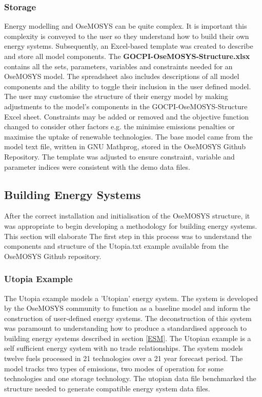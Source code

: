 \documentclass[12pt]{article}
\begin{document}
\subsubsection{Storage}\label{OSTORAGE}
Energy modelling and OseMOSYS can be quite complex. It is important this complexity is conveyed to the user so they understand how to build their own energy systems.
Subsequently, an Excel-based template was created to describe and store all model components. The \textbf{GOCPI-OseMOSYS-Structure.xlsx} contains
all the sets, parameters, variables and constraints needed for an OseMOSYS model. The spreadsheet also includes descriptions of all model components
and the ability to toggle their inclusion in the user defined model. 
The user may customise the structure of their energy model by making adjustments to the model's components in the GOCPI-OseMOSYS-Structure Excel sheet.
Constraints may be added or removed and the objective function changed to consider other factors e.g. the minimise emissions penalties or maximise the uptake of renewable technologies.
The base model came from the model text file, written in GNU Mathprog, stored in the OseMOSYS Github Repository.
The template was adjusted to ensure constraint, variable and parameter indices were consistent with the demo data files.

\subsection{Building Energy Systems}\label{BES}
After the correct installation and initialisation of the OseMOSYS structure, 
it was appropriate to begin developing a methodology for building energy systems.
This section will elaborate
The first step in this process was to understand the components and structure of the Utopia.txt example available from the OseMOSYS Github repository.
\subsubsection{Utopia Example}
The Utopia example models a 'Utopian' energy system.
The system is developed by the OseMOSYS community to function as a baseline model and inform the construction of user-defined energy systems.
The deconstruction of this system was paramount to understanding how to produce a standardised approach to building energy systems described in section \ref{ESM}.
The Utopian example is a self sufficient energy system with no trade relationships. 
The system models twelve fuels processed in 21 technologies over a 21 year forecast period.
The model tracks two types of emissions, two modes of operation for some technologies and one storage technology.
The utopian data file benchmarked the structure needed to generate compatible energy system data files. 
\end{document}
